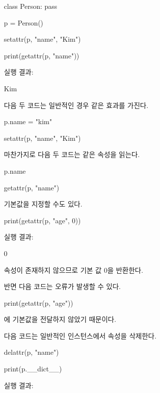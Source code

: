 \begin{dhkcode}
class Person:
    pass

p = Person()

setattr(p, "name", "Kim")

print(getattr(p, "name"))
\end{dhkcode}

실행 결과:

\begin{dhkzsh}
Kim
\end{dhkzsh}

다음 두 코드는 일반적인 경우 같은 효과를 가진다.

\begin{dhkcode}
p.name = "kim"

setattr(p, "name", "Kim")
\end{dhkcode}

마찬가지로 다음 두 코드는 같은 속성을 읽는다.

\begin{dhkcode}
p.name

getattr(p, "name")
\end{dhkcode}

기본값을 지정할 수도 있다.

\begin{dhkcode}
print(getattr(p, "age", 0))
\end{dhkcode}

실행 결과:

\begin{dhkzsh}
0
\end{dhkzsh}

 속성이 존재하지 않으므로 기본 값 0을 반환한다.

반면 다음 코드는 오류가 발생할 수 있다.

\begin{dhkcode}
print(getattr(p, "age"))
\end{dhkcode}

에 기본값을 전달하지 않았기 때문이다.

다음 코드는 일반적인 인스턴스에서  속성을 삭제한다.

\begin{dhkcode}
delattr(p, "name")

print(p.__dict__)
\end{dhkcode}

실행 결과:

\begin{dhkzsh}
{}
\end{dhkzsh}

